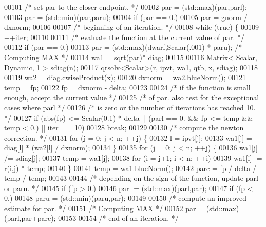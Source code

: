 \begin{DoxyCode}
00101     \textcolor{comment}{/* set par to the closer endpoint. */}
00102     par = (std::max)(par,parl);
00103     par = (std::min)(par,paru);
00104     \textcolor{keywordflow}{if} (par == 0.)
00105         par = gnorm / dxnorm;
00106 
00107     \textcolor{comment}{/* beginning of an iteration. */}
00108     \textcolor{keywordflow}{while} (\textcolor{keyword}{true}) \{
00109         ++iter;
00110 
00111         \textcolor{comment}{/* evaluate the function at the current value of par. */}
00112         \textcolor{keywordflow}{if} (par == 0.)
00113             par = (std::max)(dwarf,Scalar(.001) * paru); \textcolor{comment}{/* Computing MAX */}
00114         wa1 = sqrt(par)* diag;
00115 
00116         \hyperlink{group___core___module}{Matrix< Scalar, Dynamic, 1 >} sdiag(n);
00117         qrsolv<Scalar>(r, ipvt, wa1, qtb, x, sdiag);
00118 
00119         wa2 = diag.cwiseProduct(x);
00120         dxnorm = wa2.blueNorm();
00121         temp = fp;
00122         fp = dxnorm - delta;
00123 
00124         \textcolor{comment}{/* if the function is small enough, accept the current value */}
00125         \textcolor{comment}{/* of par. also test for the exceptional cases where parl */}
00126         \textcolor{comment}{/* is zero or the number of iterations has reached 10. */}
00127         \textcolor{keywordflow}{if} (abs(fp) <= Scalar(0.1) * delta || (parl == 0. && fp <= temp && temp < 0.) || iter == 10)
00128             \textcolor{keywordflow}{break};
00129 
00130         \textcolor{comment}{/* compute the newton correction. */}
00131         \textcolor{keywordflow}{for} (j = 0; j < n; ++j) \{
00132             l = ipvt[j];
00133             wa1[j] = diag[l] * (wa2[l] / dxnorm);
00134         \}
00135         \textcolor{keywordflow}{for} (j = 0; j < n; ++j) \{
00136             wa1[j] /= sdiag[j];
00137             temp = wa1[j];
00138             \textcolor{keywordflow}{for} (i = j+1; i < n; ++i)
00139                 wa1[i] -= r(i,j) * temp;
00140         \}
00141         temp = wa1.blueNorm();
00142         parc = fp / delta / temp / temp;
00143 
00144         \textcolor{comment}{/* depending on the sign of the function, update parl or paru. */}
00145         \textcolor{keywordflow}{if} (fp > 0.)
00146             parl = (std::max)(parl,par);
00147         \textcolor{keywordflow}{if} (fp < 0.)
00148             paru = (std::min)(paru,par);
00149 
00150         \textcolor{comment}{/* compute an improved estimate for par. */}
00151         \textcolor{comment}{/* Computing MAX */}
00152         par = (std::max)(parl,par+parc);
00153 
00154         \textcolor{comment}{/* end of an iteration. */}

\end{DoxyCode}

